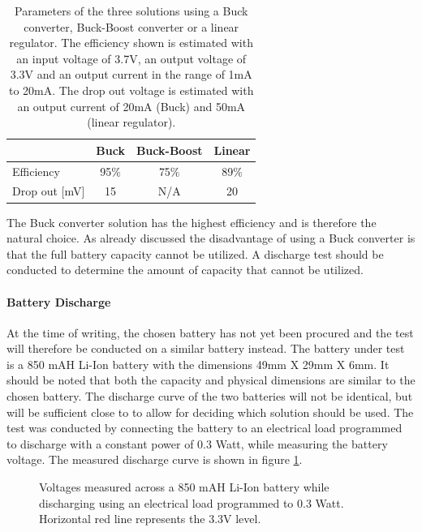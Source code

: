 \begin{table}[h]
	\centering
	\begin{tabular}{l|c|c|c}
		  				&	Buck 	& Buck-Boost 	& Linear\\
		 \hline
		 Efficiency  	&  95\% 	& 75\%			&89\%		\\
		 Drop out [mV]		&15  	& N/A		&20		\\
	\end{tabular}
	\caption[Parameters of voltage generation solutions.]{Parameters of the three solutions using a Buck converter, Buck-Boost converter or a linear regulator. The efficiency shown is estimated with an input voltage of 3.7V, an output voltage of 3.3V and an output current in the range of 1mA to 20mA. The drop out voltage is estimated with an output current of 20mA (Buck) and 50mA (linear regulator).}
	\label{tab:vol_gen_joint}
\end{table}

The Buck converter solution has the highest efficiency and is therefore the natural choice.
As already discussed the disadvantage of using a Buck converter is that the full battery capacity cannot be utilized.
A discharge test should be conducted to determine the amount of capacity that cannot be utilized.


\paragraph{Battery Discharge}
At the time of writing, the chosen battery has not yet been procured and the test will therefore be conducted on a similar battery instead.
The battery under test is a 850 mAH Li-Ion battery with the dimensions 49mm X 29mm X 6mm.
It should be noted that both the capacity and physical dimensions are similar to the chosen battery.
The discharge curve of the two batteries will not be identical, but will be sufficient close to to allow for deciding which solution should be used.
The test was conducted by connecting the battery to an electrical load programmed to discharge with a constant power of 0.3 Watt, while measuring the battery voltage.
The measured discharge curve is shown in figure \ref{fig:bat_discharge}.

\begin{figure}[h]
	\centering
	
	\caption[Discharge curve of Li-Ion battery.]{Voltages measured across a 850 mAH Li-Ion battery while discharging using an electrical load programmed to 0.3 Watt. Horizontal red line represents the 3.3V level.}
	\label{fig:bat_discharge}
\end{figure}

